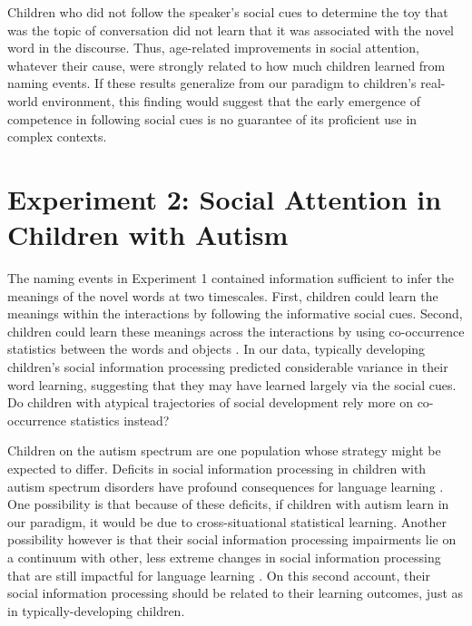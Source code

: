 \documentclass[jou,floatsintext]{apa6}
\begin{document}
Children who did not follow the speaker's social cues to determine the toy that was the topic of conversation did not learn that it was associated with the novel word in the discourse. Thus, age-related improvements in social attention, whatever their cause, were strongly related to how much children learned from naming events. If these results generalize from our paradigm to children’s real-world environment, this finding would suggest that the early emergence of competence in following social cues is no guarantee of its proficient use in complex contexts.

\section{Experiment 2: Social Attention in Children with Autism}

The naming events in Experiment 1 contained information sufficient to infer the meanings of the novel words at two timescales. First, children could learn the meanings within the interactions by following the informative social cues. Second, children could learn these meanings across the interactions by using co-occurrence statistics between the words and objects \cite{smith2008}. In our data, typically developing children's social information processing predicted considerable variance in their word learning, suggesting that they may have learned largely via the social cues. Do children with atypical trajectories of social development rely more on co-occurrence statistics instead?

Children on the autism spectrum are one population whose strategy might be expected to differ. Deficits in social information processing in children with autism spectrum disorders have profound consequences for language learning \cite{baron-cohen1997,leekam1998}. One possibility is that because of these deficits, if children with autism learn in our paradigm, it would be due to cross-situational statistical learning. Another possibility however is that their social information processing impairments lie on a continuum with other, less extreme changes in social information processing that are still impactful for language learning \cite{brooks2005}. On this second account, their social information processing should be related to their learning outcomes, just as in typically-developing children.
\end{document}
